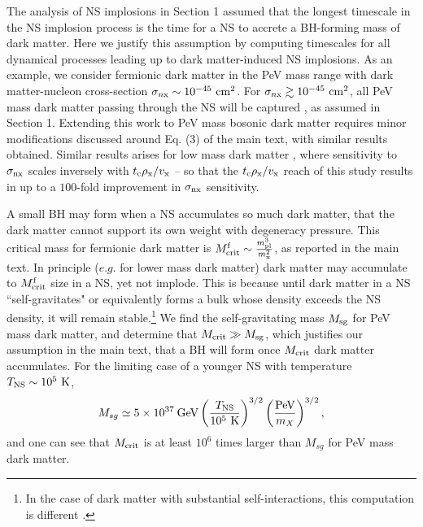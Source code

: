 \documentclass[nofootinbib,longbibliography,prd,floatfix,superscriptaddress,twocolumn]{revtex4-1}
\begin{document}
The analysis of NS implosions in Section 1 assumed that the longest timescale in the NS implosion process is the time for a NS to accrete a BH-forming mass of dark matter. Here we justify this assumption by computing timescales for all dynamical processes leading up to dark matter-induced NS implosions. As an example, we consider fermionic dark matter in the PeV mass range with dark matter-nucleon cross-section $\sigma_{n\rm x} \sim 10^{-45}~ {\rm cm^2}$. For $\sigma_{n\rm x} \gtrsim 10^{-45}~ {\rm cm^2}$, all PeV mass dark matter passing through the NS will be captured \cite{Bramante:2017xlb}, as assumed in Section 1. Extending this work to PeV mass bosonic dark matter requires minor modifications discussed around Eq. (3) of the main text, with similar results obtained. Similar results arises for low mass dark matter \cite{Kouvaris:2011gb, deLavallaz:2010wp, Bramante:2013hn, Bertoni:2013bsa, Bramante:2015cua}, where sensitivity to $\sigma_{\rm nx}$ scales inversely with $t_{\rm c} \rho_{\rm x} /v_{\rm x} $ -- so that the $t_{\rm c} \rho_{\rm x} /v_{\rm x} $ reach of this study results in up to a $100$-fold improvement in $\sigma_{\rm nx}$ sensitivity.

A small BH may form when a NS accumulates so much dark matter, that the dark matter cannot support its own weight with degeneracy pressure. This critical mass for fermionic dark matter is $M_{\rm crit}^{\rm f} \sim \frac{m_{\rm pl}^3}{m_{\rm x}^2}$, as reported in the main text. In principle ($e.g.$ for lower mass dark matter) dark matter may accumulate to $M_{\rm crit}^{\rm f}$ size in a NS, yet not implode. This is because until dark matter in a NS ``self-gravitates" or equivalently forms a bulk whose density exceeds the NS density, it will remain stable.\footnote{In the case of dark matter with substantial self-interactions, this computation is different \cite{Kouvaris:2011gb,Bramante:2013nma,Bramante:2015dfa}.} We find the self-gravitating mass $M_{\rm sg}$ \cite{Bramante:2013hn} for PeV mass dark matter, and determine that $M_{\rm crit} \gg M_{\rm sg}$, which justifies our assumption in the main text, that a BH will form once $M_{\rm crit}$ dark matter accumulates. For the limiting case of a younger NS with temperature $T_{\rm NS} \sim 10^5~{\rm K}$, 
\begin{align}
M_{sg} \simeq 5 \times 10^{37} \:{\rm GeV} \left(\frac{T_{\rm NS}}{10^5~ {\rm K}}\right)^{3/2}
\left(\frac{\rm PeV}{m_X}\right)^{3/2},
\end{align}
and one can see that $M_{\rm crit}$ is at least $10^6$ times larger than $M_{sg}$ for PeV mass dark matter.
\end{document}
